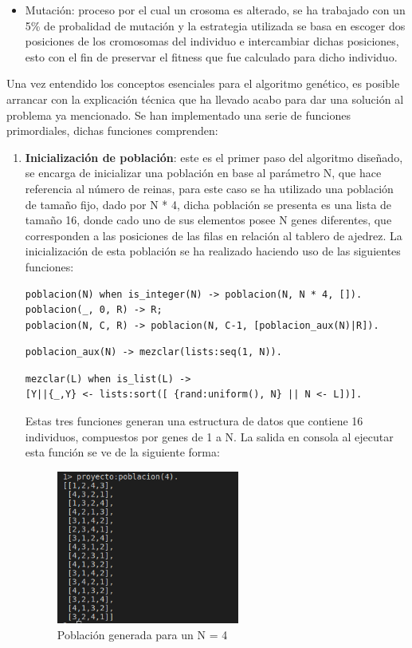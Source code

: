 \documentclass[12pt,a4paper]{article}
\begin{document}
\begin{enumerate}
\begin{itemize}
\item Mutación: proceso por el cual un crosoma es alterado, se ha trabajado con un 5\% de probalidad de mutación y la estrategia utilizada se basa en escoger dos posiciones de los cromosomas del individuo e intercambiar dichas posiciones, esto con el fin de preservar el fitness que fue calculado para dicho individuo.
\end{itemize}
Una vez entendido los conceptos esenciales para el algoritmo genético, es posible arrancar con la explicación técnica que ha llevado acabo para dar una solución al problema ya mencionado. Se han implementado una serie de funciones primordiales, dichas funciones comprenden:
\begin{enumerate}
\item \textbf{Inicialización de población}: este es el primer paso del algoritmo diseñado, se encarga de inicializar una población en base al parámetro N, que hace referencia al número de reinas, para este caso se ha utilizado una población de tamaño fijo, dado por N * 4, dicha población se presenta es una lista de tamaño 16, donde cado uno de sus elementos posee N genes diferentes, que corresponden a las posiciones de las filas en relación al tablero de ajedrez. La inicialización de esta población se ha realizado haciendo uso de las siguientes funciones:
\begin{verbatim}
poblacion(N) when is_integer(N) -> poblacion(N, N * 4, []).
poblacion(_, 0, R) -> R;
poblacion(N, C, R) -> poblacion(N, C-1, [poblacion_aux(N)|R]).
\end{verbatim} 
\begin{verbatim}
poblacion_aux(N) -> mezclar(lists:seq(1, N)).
\end{verbatim}  
\begin{verbatim}
mezclar(L) when is_list(L) -> 
[Y||{_,Y} <- lists:sort([ {rand:uniform(), N} || N <- L])].
\end{verbatim}  
Estas tres funciones generan una estructura de datos que contiene 16 individuos, compuestos por genes de 1 a N. La salida en consola al ejecutar esta función se ve de la siguiente forma:
\begin{figure}[htp]
\centering
\includegraphics[width=6cm]{imagenes/g1.png} 
\caption{Población generada para un N = 4}
\label{foto}
\end{figure}


\end{enumerate}
\end{enumerate}
\end{document}
